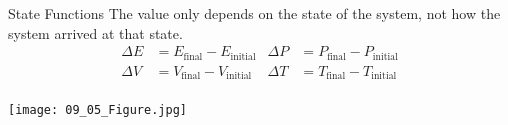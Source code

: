 \documentclass[handout]{beamer}
\begin{document}

	
\begin{frame}{State Functions}
	The value only depends on the state of the system, not how the
	system arrived at that state.
	\begin{align*}
		\Delta E &= E_\text{final} - E_\text{initial} &
		\Delta P &= P_\text{final} - P_\text{initial} \\
		\Delta V &= V_\text{final} - V_\text{initial} &
		\Delta T &= T_\text{final} - T_\text{initial} \\
	\end{align*}
	\begin{center}
		\texttt{[image: 09\_05\_Figure.jpg]}
	\end{center}
\end{frame}

%
\end{document}
